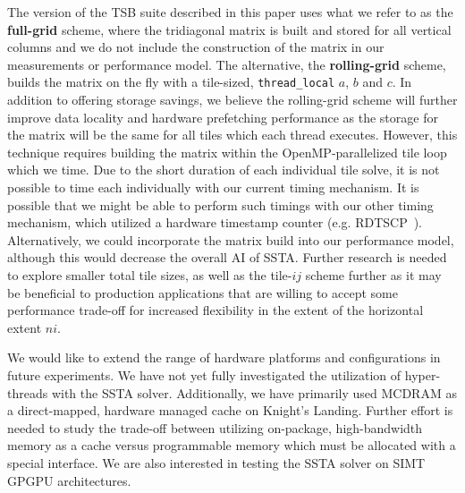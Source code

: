 \documentclass{sig-alternate-05-2015}
\begin{document}
The version of the TSB suite described in this paper uses what we refer to as
  the \textbf{full-grid} scheme, where the tridiagonal matrix is built and stored
  for all vertical columns and we do not include the construction of the matrix
  in our measurements or performance model.
The alternative, the \textbf{rolling-grid} scheme, builds the matrix on the fly
  with a tile-sized, \lstinline{thread_local} \(a\), \(b\) and \(c\).
In addition to offering storage savings, we believe the rolling-grid scheme
  will further improve data locality and hardware prefetching performance as the
  storage for the matrix will be the same for all tiles which each thread
  executes.
However, this technique requires building the matrix within the
  OpenMP-parallelized tile loop which we time.
Due to the short duration of each individual tile solve, it is not possible to
  time each individually with our current timing mechanism.
It is possible that we might be able to perform such timings with our other
  timing mechanism, which utilized a hardware timestamp counter (e.g.
  RDTSCP~\cite{intel_opt_manual}).
Alternatively, we could incorporate the matrix build into our performance
  model, although this would decrease the overall AI of SSTA.
Further research is needed to explore smaller total tile sizes, as well as the
  tile-\(ij\) scheme further as it may be beneficial to production applications
  that are willing to accept some performance trade-off for increased flexibility
  in the extent of the horizontal extent \(ni\).

We would like to extend the range of hardware platforms and configurations in
  future experiments.
We have not yet fully investigated the utilization of hyper-threads with the
  SSTA solver.
Additionally, we have primarily used MCDRAM as a direct-mapped, hardware
managed cache on Knight's Landing.
Further effort is needed to study the trade-off between utilizing on-package,
  high-bandwidth memory as a cache versus programmable memory which must be
  allocated with a special interface.
We are also interested in testing the SSTA solver on SIMT GPGPU
  architectures.
\end{document}
